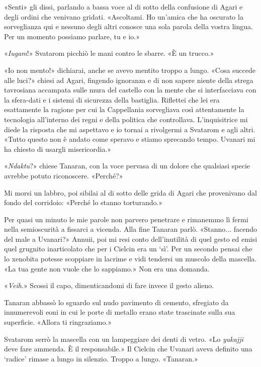 «Senti» gli dissi, parlando a bassa voce al di sotto della confusione di
Agari e degli ordini che venivano gridati. «Ascoltami. Ho un'amica che
ha oscurato la sorveglianza qui e nessuno degli altri conosce una sola
parola della vostra lingua. Per un momento possiamo parlare, tu e io.»

«\emph{Iugam}!» Svatarom picchiò le mani contro le sbarre. «È un
trucco.»

«Io non mento!» dichiarai, anche se avevo mentito troppo a lungo. «Cosa
succede alle luci?» chiesi ad Agari, fingendo ignoranza e di non sapere
niente della strega tavrosiana accampata sulle mura del castello con la
mente che si interfacciava con la sfera-dati e i sistemi di sicurezza
della bastiglia. Riflettei che lei era esattamente la ragione per cui la
Cappellania sorvegliava così attentamente la tecnologia all'interno dei
regni e della politica che controllava. L'inquisitrice mi diede la
risposta che mi aspettavo e io tornai a rivolgermi a Svatarom e agli
altri. «Tutto questo non è andato come speravo e stiamo sprecando tempo.
Uvanari mi ha chiesto di usargli misericordia.»

«\emph{Ndaktu}?» chiese Tanaran, con la voce pervasa di un dolore che
qualsiasi specie avrebbe potuto riconoscere. «Perché?»

Mi morsi un labbro, poi sibilai al di sotto delle grida di Agari che
provenivano dal fondo del corridoio: «Perché lo stanno torturando.»

Per quasi un minuto le mie parole non parvero penetrare e rimanemmo lì
fermi nella semioscurità a fissarci a vicenda. Alla fine Tanaran parlò.
«Stanno... facendo del male a Uvanari?» Annuii, poi mi resi conto
dell'inutilità di quel gesto ed emisi quel grugnito inarticolato che per
i Cielcin era un `sì'. Per un secondo pensai che lo xenobita potesse
scoppiare in lacrime e vidi tendersi un muscolo della mascella. «La tua
gente non vuole che lo sappiamo.» Non era una domanda.

«\emph{Veih}.» Scossi il capo, dimenticandomi di fare invece il gesto
alieno.

Tanaran abbassò lo sguardo sul nudo pavimento di cemento, sfregiato da
innumerevoli eoni in cui le porte di metallo erano state trascinate
sulla sua superficie. «Allora ti ringraziamo.»

Svatarom serrò la mascella con un lampeggiare dei denti di vetro. «Lo
\emph{yukajji} deve fare ammenda. È il responsabile.» Il Cielcin che
Uvanari aveva definito una `radice' rimase a lungo in silenzio. Troppo a
lungo. «Tanaran.»

